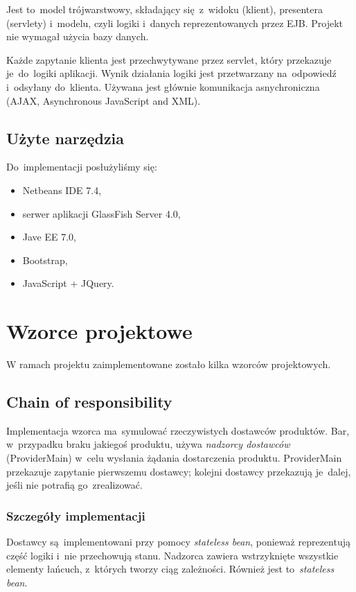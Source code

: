 \documentclass[11pt]{aghdpl}
\begin{document}
Jest to~model trójwarstwowy, składający się~z~widoku (klient), presentera (servlety) i~modelu, czyli logiki i~danych reprezentowanych przez EJB. Projekt nie wymagał użycia bazy danych.

Każde zapytanie klienta jest przechwytywane przez servlet, który przekazuje je~do~logiki aplikacji. Wynik działania logiki jest przetwarzany na~odpowiedź i~odsyłany do~klienta. Używana jest głównie komunikacja asnychroniczna (AJAX, Asynchronous JavaScript and XML).

\section{Użyte narzędzia}
Do~implementacji posłużyliśmy się:
\begin{itemize}
 \item Netbeans IDE 7.4,
 \item serwer aplikacji GlassFish Server 4.0,
 \item Jave EE 7.0,
 \item Bootstrap,
 \item JavaScript + JQuery.
\end{itemize}



\chapter{Wzorce projektowe}
W ramach projektu zaimplementowane zostało kilka wzorców projektowych.
\section{Chain of responsibility}
Implementacja wzorca ma~symulować rzeczywistych dostawców produktów. Bar, w~przypadku braku jakiegoś produktu, używa \textit{nadzorcy dostawców} (ProviderMain) w~celu wysłania żądania dostarczenia produktu. ProviderMain przekazuje zapytanie pierwszemu dostawcy;
kolejni dostawcy przekazują je~dalej, jeśli nie potrafią go~zrealizować.

\subsection{Szczegóły implementacji}
Dostawcy są~implementowani przy pomocy \textit{stateless bean}, ponieważ reprezentują część logiki i~nie przechowują stanu. Nadzorca zawiera wstrzyknięte wszystkie elementy łańcuch, z~których tworzy ciąg zależności. Również jest to~\textit{stateless bean}.
\end{document}
